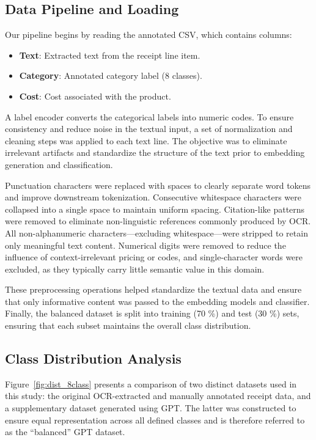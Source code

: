 \documentclass{SGGW-thesis-EN}
\begin{document}
\subsection{Data Pipeline and Loading}
Our pipeline begins by reading the annotated CSV, which contains columns:
\begin{itemize}
  \item \textbf{Text}: Extracted text from the receipt line item.
  \item \textbf{Category}: Annotated category label (8 classes).
  \item \textbf{Cost}: Cost associated with the product.
\end{itemize}
A label encoder converts the categorical labels into numeric codes. 
To ensure consistency and reduce noise in the textual input, a set of normalization and cleaning steps was applied to each text line. 
The objective was to eliminate irrelevant artifacts and standardize the structure of the 
text prior to embedding generation and classification.

Punctuation characters were replaced with spaces to clearly separate word tokens and improve downstream tokenization. 
Consecutive whitespace characters were collapsed into a single space to maintain uniform spacing. 
Citation-like patterns were removed to eliminate non-linguistic references commonly produced by OCR.
All non-alphanumeric characters—excluding whitespace—were stripped to retain only meaningful text content. 
Numerical digits were removed to reduce the influence of context-irrelevant pricing or codes, and single-character words were  
excluded, as they typically carry little semantic value in this domain.

These preprocessing operations helped standardize the textual data and ensure that only informative content was passed to the embedding models  
and classifier.
Finally, the balanced dataset is split into training (70 \%) and test (30 \%) sets, ensuring that each
subset maintains the overall class distribution.

\subsection{Class Distribution Analysis}

Figure~\ref{fig:dist_8class} presents a comparison of two distinct datasets used in this study: the original OCR-extracted and manually  
annotated receipt data, and a supplementary dataset generated using GPT. The latter was constructed to ensure equal representation across all  
defined classes and is therefore referred to as the “balanced” GPT dataset.
\end{document}
